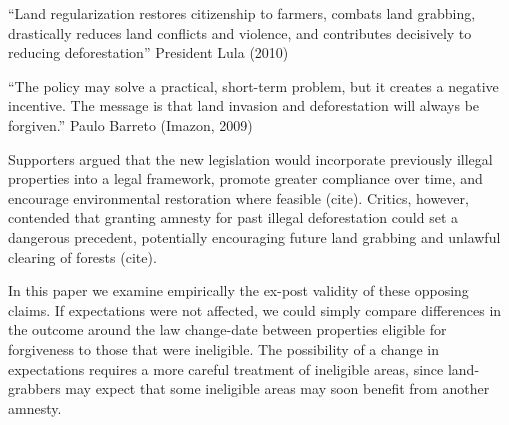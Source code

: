 \documentclass[12pt]{article}
\newcommand{\JS}[1]{{\color{red}{#1}}}
\newcommand{\PTR}[1]{{\color{blue}{#1}}}
\begin{document}
“Land regularization restores citizenship to farmers, combats land grabbing, drastically reduces land
conflicts and violence, and contributes decisively to reducing deforestation” President Lula (2010)

“The policy may solve a practical, short-term problem, but it creates a negative incentive. The message is
that land invasion and deforestation will always be forgiven.” Paulo Barreto (Imazon, 2009)

Supporters argued that the new legislation would incorporate previously illegal properties into a legal framework, promote greater compliance over time, and encourage environmental restoration where feasible (cite). Critics, however, contended that granting amnesty for past illegal deforestation could set a dangerous precedent, potentially encouraging future land grabbing and unlawful clearing of forests (cite).

In this paper we examine empirically the ex-post validity of these opposing claims. If expectations were not affected, we could simply compare differences in the outcome around the law change-date between properties eligible for forgiveness to those that were ineligible. The possibility of a change in expectations requires a more careful treatment of ineligible areas, since land-grabbers may expect that  some ineligible areas  may soon benefit from another amnesty.


\JS{ Pedro: Estamos usando estas 4 classes ou merging (1)  (2) e (3)? De todo modo é melhor inicialmente considerar as 4 classes  }
\PTR{Addressed!}
\end{document}
